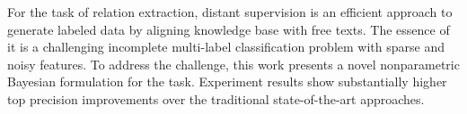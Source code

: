 For the task of relation extraction, distant supervision is an efficient approach to generate labeled data by aligning knowledge base with free texts. The essence of it is a challenging incomplete multi-label classification problem with sparse and noisy features. To address the challenge, this work presents a novel nonparametric Bayesian formulation for the task. Experiment results show substantially higher top precision improvements over the traditional state-of-the-art approaches.
